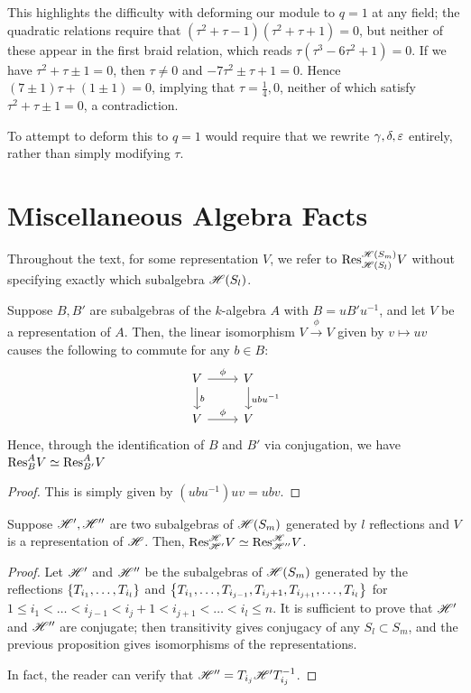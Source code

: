 \documentclass{amsart}
\begin{document}
This highlights the difficulty with deforming our module to $q = 1$ at any field;
the quadratic relations require that $(\tau^2 + \tau - 1)(\tau^2 + \tau + 1) = 0$, but neither of these appear in the first braid relation, which reads $\tau (\tau^3 - 6 \tau^2 + 1) = 0$.
If we have $\tau^2 + \tau \pm 1 = 0$, then $\tau \neq 0$ and $-7\tau^2 \pm \tau + 1 = 0$.
Hence $(7 \pm 1)\tau + (1 \pm 1) = 0$, implying that $\tau = \frac{1}{4},0$, neither of which satisfy $\tau^2 + \tau \pm 1 = 0$, a contradiction.

To attempt to deform this to $q = 1$ would require that we rewrite $\gamma,\delta,\varepsilon$ entirely, rather than simply modifying $\tau$. 
 
\section{Miscellaneous Algebra Facts}
Throughout the text, for some representation $V$, we refer to $\text{Res}_{\mathscr{H}(S_{l})}^{\mathscr{H}(S_m)} V$ without specifying exactly which subalgebra $\mathscr{H}(S_{l})$.
\begin{proposition}
  Suppose $B,B'$ are subalgebras of the $k$-algebra $A$ with $B = uB'u^{-1}$, and let $V$ be a representation of $A$.
  Then, the linear isomorphism $V \xrightarrow{\phi} V$ given by $v \mapsto uv$ causes the following to commute for any $b \in B$:
  \[
    \begin{tikzcd}
      V \arrow[r,"\phi"] \arrow[d,"b"] & V \arrow[d,"ubu^{-1}"]\\
      V \arrow[r,"\phi"] & V
    \end{tikzcd}
  \]
  Hence, through the identification of $B$ and $B'$ via conjugation, we have $\text{Res}_{B}^A V \simeq \text{Res}_{B'}^A V$
\end{proposition}
\begin{proof}
  This is simply given by $(ubu^{-1})uv = ubv$.
\end{proof}

\begin{corollary}
  Suppose $\mathscr{H}',\mathscr{H}''$ are two subalgebras of $\mathscr{H}(S_m)$ generated by $l$ reflections and $V$ is a representation of $\mathscr{H}$.
  Then, $\text{Res}_{\mathscr{H}'}^{\mathscr{H}} V \simeq \text{Res}_{\mathscr{H}''}^{\mathscr{H}} V$.
\end{corollary}
\begin{proof}
  Let $\mathscr{H}'$ and $\mathscr{H}''$ be the subalgebras of $\mathscr{H}(S_m)$ generated by the reflections $\left\{ T_{i_1},\dots,T_{i_l} \right\}$ and $\left\{ T_{i_1},\dots,T_{i_{j-1}},T_{i_j + 1},T_{i_{j+1}},\dots,T_{i_l} \right\}$ for $1 \leq i_1 < \dots < i_{j-1} < i_j + 1 < i_{j+1} < \dots < i_l \leq n$.
  It is sufficient to prove that $\mathscr{H}'$ and $\mathscr{H}''$ are conjugate;
  then transitivity gives conjugacy of any $S_l \subset S_m$, and the previous proposition gives isomorphisms of the representations.
  
  In fact, the reader can verify that $\mathscr{H}'' = T_{i_j}\mathscr{H}'T_{i_j}^{-1}$.
\end{proof}
\end{document}
